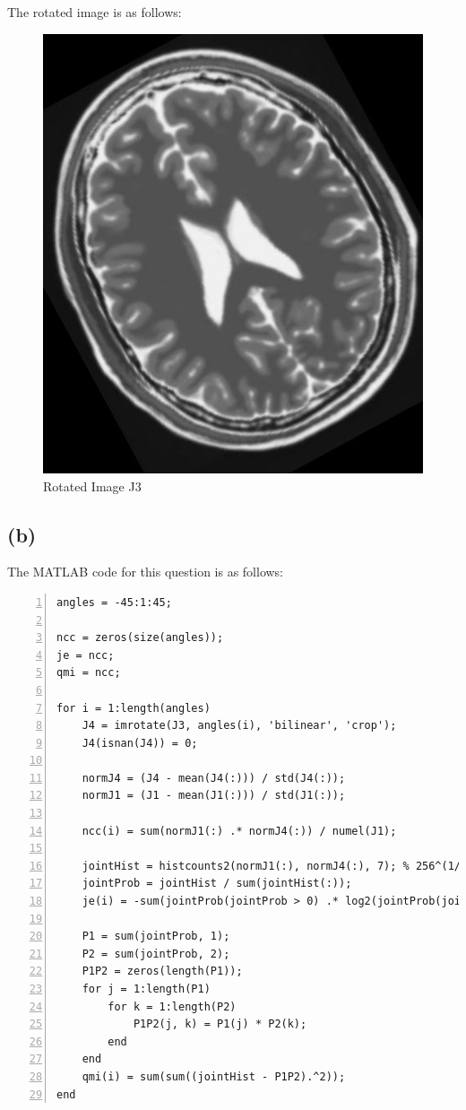 \documentclass{article}
\begin{document}
The rotated image is as follows:
\begin{figure}[H]
\centering
\includegraphics[scale=0.3]{./Q5/J3.jpg}
\caption{Rotated Image J3}
\end{figure}

\newpage
\subsection*{(b)}

The MATLAB code for this question is as follows:
\begin{lstlisting}[frame=single,numbers=left,style=Matlab-Pyglike,breaklines=true,postbreak=\mbox{\textcolor{red}{$\hookrightarrow$}\space}]
angles = -45:1:45;

ncc = zeros(size(angles));
je = ncc;
qmi = ncc;

for i = 1:length(angles)
    J4 = imrotate(J3, angles(i), 'bilinear', 'crop');
    J4(isnan(J4)) = 0;
    
    normJ4 = (J4 - mean(J4(:))) / std(J4(:));
    normJ1 = (J1 - mean(J1(:))) / std(J1(:));
    
    ncc(i) = sum(normJ1(:) .* normJ4(:)) / numel(J1);
    
    jointHist = histcounts2(normJ1(:), normJ4(:), 7); % 256^(1/3) bins approximately
    jointProb = jointHist / sum(jointHist(:));
    je(i) = -sum(jointProb(jointProb > 0) .* log2(jointProb(jointProb > 0)));
    
    P1 = sum(jointProb, 1);
    P2 = sum(jointProb, 2);
    P1P2 = zeros(length(P1));
    for j = 1:length(P1)
        for k = 1:length(P2)
            P1P2(j, k) = P1(j) * P2(k);
        end
    end
    qmi(i) = sum(sum((jointHist - P1P2).^2));
end
\end{lstlisting}
\end{document}
